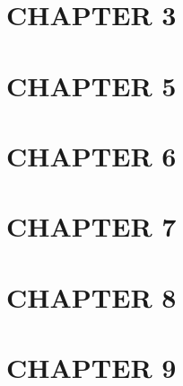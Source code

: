 
%
%
\chapter{CHAPTER 3}

\cite{holmessmith3234}


\chapter{CHAPTER 5}


\chapter{CHAPTER 6}


\chapter{CHAPTER 7}


\chapter{CHAPTER 8}


\chapter{CHAPTER 9}


